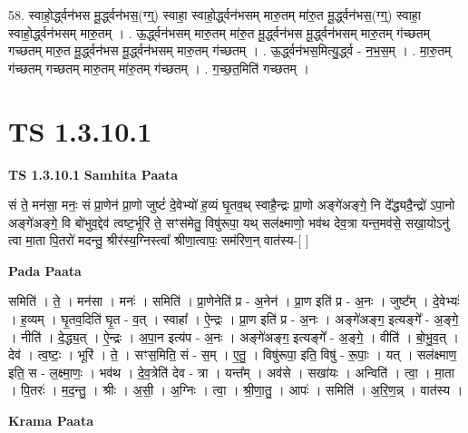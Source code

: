 \documentclass[17pt]{extarticle}
\begin{document}
58. स्वाहो॒र्द्ध्वन॑भस मू॒र्द्ध्वन॑भस॒(ग्ग्॒) स्वाहा॒ स्वाहो॒र्द्ध्वन॑भसम् मारु॒तम् मा॑रु॒त मू॒र्द्ध्वन॑भस॒(ग्ग्॒) स्वाहा॒ स्वाहो॒र्द्ध्वन॑भसम् मारु॒तम् । . ऊ॒र्द्ध्वन॑भसम् मारु॒तम् मा॑रु॒त मू॒र्द्ध्वन॑भस मू॒र्द्ध्वन॑भसम् मारु॒तम् ग॑च्छतम् गच्छतम् मारु॒त मू॒र्द्ध्वन॑भस मू॒र्द्ध्वन॑भसम् मारु॒तम् ग॑च्छतम् । . ऊ॒र्द्ध्वन॑भस॒मित्यु॒र्द्ध्व - न॒भ॒स॒म् । . मा॒रु॒तम् ग॑च्छतम् गच्छतम् मारु॒तम् मा॑रु॒तम् ग॑च्छतम् । . ग॒च्छ॒त॒मिति॑ गच्छतम् । \newline
\pagebreak
{}
\section*{ TS 1.3.10.1 }

\textbf{TS 1.3.10.1 } \newline
\textbf{Samhita Paata} \newline

सं ते॒ मन॑सा॒ मनः॒ सं प्रा॒णेन॑ प्रा॒णो जुष्टं॑ दे॒वेभ्यो॑ ह॒व्यं घृ॒तव॒थ् स्वाहै॒न्द्रः प्रा॒णो अङ्गे॑अङ्गे॒ नि दे᳚द्ध्यदै॒न्द्रो॑ ऽपा॒नो अङ्गे॑अङ्गे॒ वि बो॑भुव॒द्देव॑ त्वष्ट॒र्भूरि॑ ते॒ सꣳस॑मेतु॒ विषु॑रूपा॒ यथ् सल॑क्ष्माणो॒ भव॑थ देव॒त्रा यन्त॒मव॑से॒ सखा॒योऽनु॑ त्वा मा॒ता पि॒तरो॑ मदन्तु॒ श्रीर॑स्य॒ग्निस्त्वा᳚ श्रीणा॒त्वापः॒ सम॑रिण॒न् वात॑स्य-[ ] \newline

\textbf{Pada Paata} \newline

समिति॑ । ते॒ । मन॑सा । मनः॑ । समिति॑ । प्रा॒णेनेति॑ प्र - अ॒नेन॑ । प्रा॒ण इति॑ प्र - अ॒नः । जुष्ट᳚म् । दे॒वेभ्यः॑ । ह॒व्यम् । घृ॒तव॒दिति॑ घृ॒त - व॒त् । स्वाहा᳚ । ऐ॒न्द्रः । प्रा॒ण इति॑ प्र - अ॒नः । अङ्गे॑अङ्ग॒ इत्यङ्गे᳚ - अ॒ङ्गे॒ । नीति॑ । दे॒द्ध्य॒त् । ऐ॒न्द्रः । अ॒पा॒न इत्य॑प - अ॒नः । अङ्गे॑अङ्ग॒ इत्यङ्गे᳚ - अ॒ङ्गे॒ । वीति॑ । बो॒भु॒व॒त् । देव॑ । त्व॒ष्टः॒ । भूरि॑ । ते॒ । सꣳस॒मिति॒ सं - स॒म् । ए॒तु॒ । विषु॑रूपा॒ इति॒ विषु॑ - रू॒पाः॒ । यत् । सल॑क्ष्माण॒ इति॒ स - ल॒क्ष्मा॒णः॒ । भव॑थ । दे॒व॒त्रेति॑ देव - त्रा । यन्त᳚म् । अव॑से । सखा॑यः । अन्विति॑ । त्वा॒ । मा॒ता । पि॒तरः॑ । म॒द॒न्तु॒ । श्रीः । अ॒सी॒ । अ॒ग्निः । त्वा॒ । श्री॒णा॒तु॒ । आपः॑ । समिति॑ । अ॒रि॒ण॒न्न् । वात॑स्य ।  \newline


\textbf{Krama Paata} \newline
\end{document}
